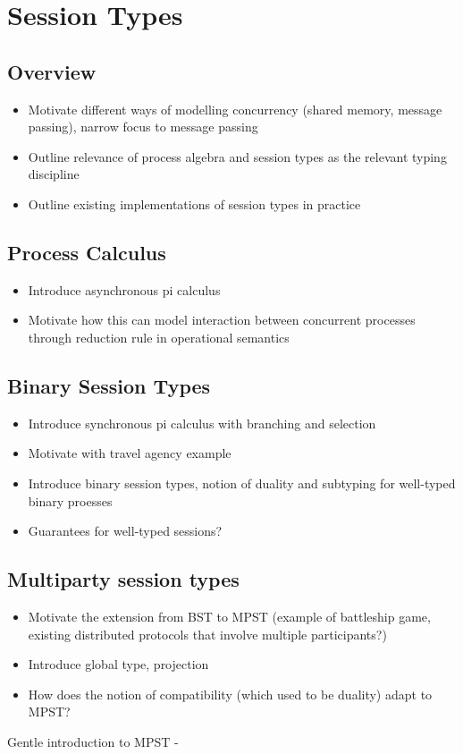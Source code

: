\section{Session Types}

\subsection{Overview}
\begin{itemize}
\item Motivate different ways of modelling concurrency (shared memory, message passing), narrow focus to message passing
\item Outline relevance of process algebra and session types as the relevant typing discipline
\item Outline existing implementations of session types in practice
\end{itemize}

\subsection{Process Calculus}
\begin{itemize}
\item Introduce asynchronous pi calculus
\item Motivate how this can model interaction between concurrent processes through reduction rule in operational semantics
\end{itemize}

\subsection{Binary Session Types}
\begin{itemize}
\item Introduce synchronous pi calculus with branching and selection
\item Motivate with travel agency example
\item Introduce binary session types, notion of duality and subtyping for well-typed binary proesses
\item Guarantees for well-typed sessions?
\end{itemize}

\subsection{Multiparty session types}
\begin{itemize}
\item Motivate the extension from BST to MPST (example of battleship game, existing distributed protocols that involve multiple participants?)
\item Introduce global type, projection
\item How does the notion of compatibility (which used to be duality) adapt to MPST?
\end{itemize}

Gentle introduction to MPST - \cite{MPST}